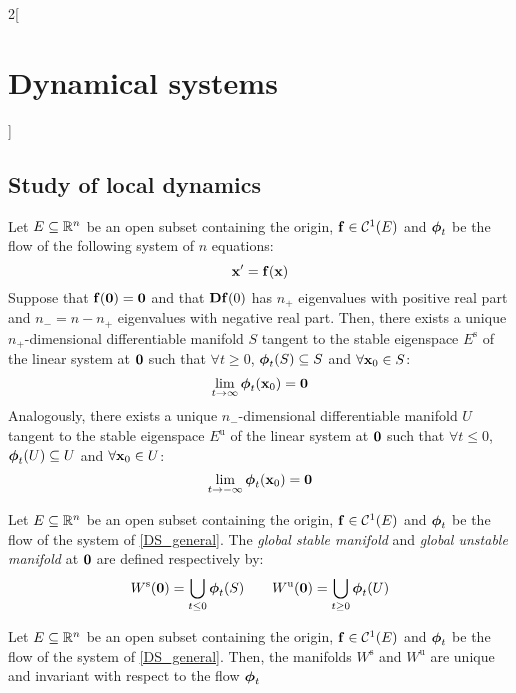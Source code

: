 \documentclass[../../../main_math.tex]{subfiles}
\begin{document}
\begin{multicols}{2}[\section{Dynamical systems}]
  \subsection{Study of local dynamics}
  \begin{theorem}
    Let $E\subseteq\mathbb{R}^n$ be an open subset containing the origin, $\boldsymbol{\mathrm{f}}\in\mathcal{C}^1(E)$ and $\boldsymbol{\mathrm{\phi}}_t$ be the flow of the following system of $n$ equations:
    \begin{equation}\label{DS_general}
      \boldsymbol{\mathrm{x}}' =\boldsymbol{\mathrm{f}}(\boldsymbol{\mathrm{x}})
    \end{equation}
    Suppose that $\boldsymbol{\mathrm{f}}(\boldsymbol{\mathrm{0}})=\boldsymbol{\mathrm{0}}$ and that $\boldsymbol{\mathrm{Df}}(0)$ has $n_+$ eigenvalues with positive real part and $n_-=n-n_+$ eigenvalues with negative real part. Then, there exists a unique $n_+$-dimensional differentiable manifold $S$ tangent to the stable eigenspace $E^\text{s}$ of the linear system at $\boldsymbol{\mathrm{0}}$ such that $\forall t\geq 0$, $\boldsymbol{\mathrm{\phi}}_t(S)\subseteq S$ and $\forall \boldsymbol{\mathrm{x}}_0\in S$: $$\lim_{t\to\infty}\boldsymbol{\mathrm{\phi}}_t(\boldsymbol{\mathrm{x}}_0)=\boldsymbol{\mathrm{0}}$$
    Analogously, there exists a unique $n_-$-dimensional differentiable manifold $U$ tangent to the stable eigenspace $E^\text{u}$ of the linear system at $\boldsymbol{\mathrm{0}}$ such that $\forall t\leq 0$, $\boldsymbol{\mathrm{\phi}}_t(U)\subseteq U$ and $\forall \boldsymbol{\mathrm{x}}_0\in U$: $$\lim_{t\to-\infty}\boldsymbol{\mathrm{\phi}}_t(\boldsymbol{\mathrm{x}}_0)=\boldsymbol{\mathrm{0}}$$
  \end{theorem}
  \begin{definition}
    Let $E\subseteq\mathbb{R}^n$ be an open subset containing the origin, $\boldsymbol{\mathrm{f}}\in\mathcal{C}^1(E)$ and $\boldsymbol{\mathrm{\phi}}_t$ be the flow of the system of \cref{DS_general}. The \emph{global stable manifold} and \emph{global unstable manifold} at $\boldsymbol{\mathrm{0}}$ are defined respectively by:
    $$W^\text{s}(\boldsymbol{\mathrm{0}})=\bigcup_{t\leq 0}\boldsymbol{\mathrm{\phi}}_t(S)\qquad W^\text{u}(\boldsymbol{\mathrm{0}})=\bigcup_{t\geq 0}\boldsymbol{\mathrm{\phi}}_t(U)$$
  \end{definition}
  \begin{proposition}
    Let $E\subseteq\mathbb{R}^n$ be an open subset containing the origin, $\boldsymbol{\mathrm{f}}\in\mathcal{C}^1(E)$ and $\boldsymbol{\mathrm{\phi}}_t$ be the flow of the system of \cref{DS_general}. Then, the manifolds $W^\text{s}$ and $W^\text{u}$ are unique and invariant with respect to the flow $\boldsymbol{\mathrm{\phi}}_t$
  \end{proposition}
  \begin{theorem}

\end{theorem}
\end{multicols}
\end{document}
